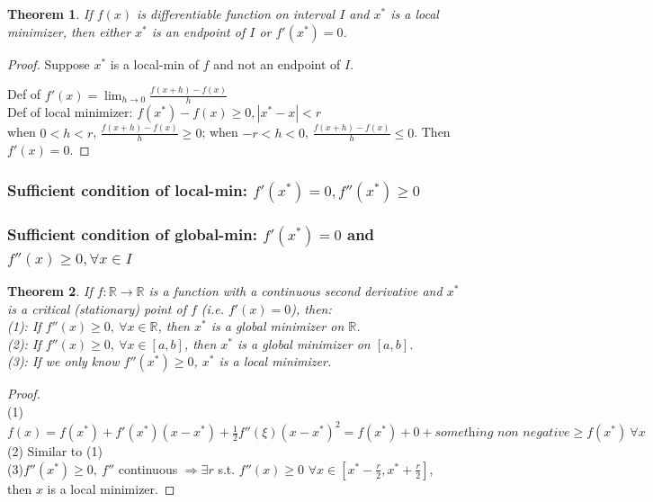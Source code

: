 \documentclass[11pt,a4paper]{article}
\newtheorem{theorem}{Theorem}
\begin{document}
\begin{theorem}
If $f(x)$ is differentiable function on interval $I$ and $x^*$ is a local minimizer, then either $x^*$ is an endpoint of $I$ or $f'(x^*)=0$.
\end{theorem}

\begin{proof}
Suppose $x^*$ is a local-min of $f$ and not an endpoint of $I$.

Def of $f'(x)=\lim_{h \rightarrow 0} \frac{f(x+h)-f(x)}{h}$\\
Def of local minimizer: $f(x^*)-f(x)\geq 0, |x^*-x|<r$\\
when $0<h<r$, $\frac{f(x+h)-f(x)}{h}\geq 0$; when $-r<h<0$, $\frac{f(x+h)-f(x)}{h}\leq 0$. Then $f'(x)=0$.
\end{proof}

\subsubsection{ Sufficient condition of local-min: $f'(x^*)=0, f''(x^*)\geq 0$}

\subsubsection{ Sufficient condition of global-min: $f'(x^*)=0$ and $f''(x)\geq 0,\forall x\in I$}
\begin{theorem}
    If $f:\mathbb{R} \rightarrow \mathbb{R}$ is a function with a continuous second derivative and $x^*$ is a critical (stationary) point of $f$ (i.e. $f'(x)=0$), then:\\
    (1): If $f''(x)\geq 0,\ \forall x\in\mathbb{R}$, then $x^*$ is a global minimizer on $\mathbb{R}$.\\
    (2): If $f''(x)\geq 0,\ \forall x\in[a,b]$, then $x^*$ is a global minimizer on $[a,b]$.\\
    (3): If we only know $f''(x^*)\geq 0$, $x^*$ is a local minimizer.
\end{theorem}
\begin{proof}
\quad\\
(1)$f(x)=f(x^*)+f'(x^*)(x-x^*)+\frac{1}{2}f''(\xi)(x-x^*)^2=f(x^*)+0+\textit{something non negative}\geq f(x^*)\  \forall x$\\
(2) Similar to (1)\\
(3)$f''(x^*)\geq 0,\ f''$ continuous $\Rightarrow \exists r$ s.t. $f''(x)\geq 0$ $\forall x\in[x^*-\frac{r}{2},x^*+\frac{r}{2}]$, then $x$ is a local minimizer.
\end{proof}
\end{document}
